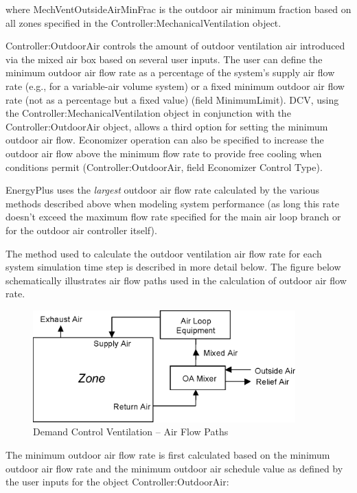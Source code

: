 where MechVentOutsideAirMinFrac is the outdoor air minimum fraction based on all zones specified in the Controller:MechanicalVentilation object.

Controller:OutdoorAir controls the amount of outdoor ventilation air introduced via the mixed air box based on several user inputs. The user can define the minimum outdoor air flow rate as a percentage of the system's supply air flow rate (e.g., for a variable-air volume system) or a fixed minimum outdoor air flow rate (not as a percentage but a fixed value) (field MinimumLimit). DCV, using the Controller:MechanicalVentilation object in conjunction with the Controller:OutdoorAir object, allows a third option for setting the minimum outdoor air flow. Economizer operation can also be specified to increase the outdoor air flow above the minimum flow rate to provide free cooling when conditions permit (Controller:OutdoorAir, field Economizer Control Type).

EnergyPlus uses the \emph{largest} outdoor air flow rate calculated by the various methods described above when modeling system performance (as long this rate doesn't exceed the maximum flow rate specified for the main air loop branch or for the outdoor air controller itself).

The method used to calculate the outdoor ventilation air flow rate for each system simulation time step is described in more detail below. The figure below schematically illustrates air flow paths used in the calculation of outdoor air flow rate.

\begin{figure}[hbtp] %
\centering
\includegraphics[width=0.9\textwidth, height=0.9\textheight, keepaspectratio=true]{media/image4731.png}
\caption{Demand Control Ventilation -- Air Flow Paths \protect \label{fig:demand-control-ventilation-air-flow-paths}}
\end{figure}

The minimum outdoor air flow rate is first calculated based on the minimum outdoor air flow rate and the minimum outdoor air schedule value as defined by the user inputs for the object Controller:OutdoorAir:

